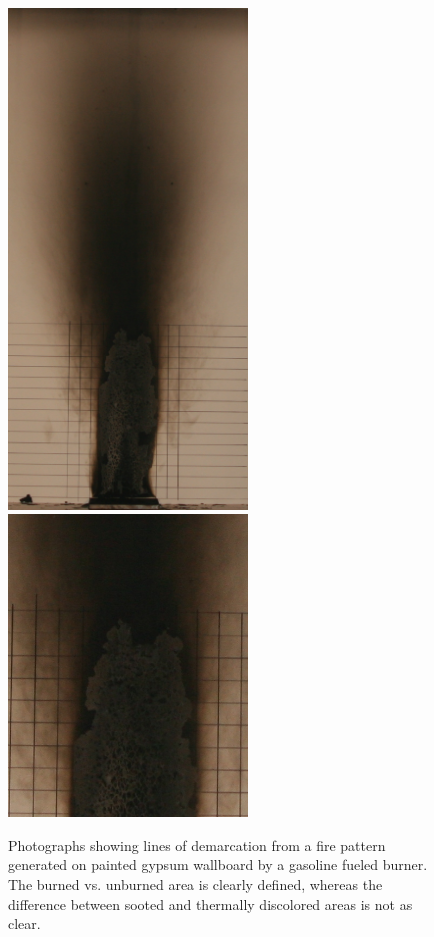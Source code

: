 \documentclass[twoside]{uocthesis}
\begin{document}
{\begin{figure}[p]
	\centering
	\includegraphics[width=2.5in]{../Figures/Soot_pattern}
	\includegraphics[width=2.5in]{../Figures/Soot_close}	\\
	\caption[Photographs showing lines of demarcation with gasoline]{Photographs showing lines of demarcation from a fire pattern generated on painted gypsum wallboard by a gasoline fueled burner.  The burned vs. unburned area is clearly defined, whereas the difference between sooted and thermally discolored areas is not as clear.}
	\label{Soot_pattern}
\end{figure}


}
\end{document}
